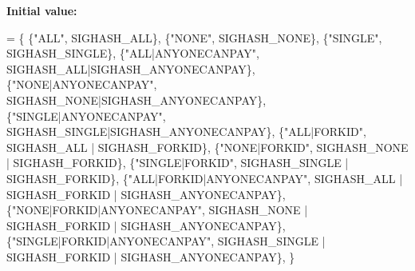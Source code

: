 {\bfseries Initial value\+:}
\begin{DoxyCode}
= \{
    \{\textcolor{stringliteral}{"ALL"}, SIGHASH\_ALL\},
    \{\textcolor{stringliteral}{"NONE"}, SIGHASH\_NONE\},
    \{\textcolor{stringliteral}{"SINGLE"}, SIGHASH\_SINGLE\},
    \{\textcolor{stringliteral}{"ALL|ANYONECANPAY"}, SIGHASH\_ALL|SIGHASH\_ANYONECANPAY\},
    \{\textcolor{stringliteral}{"NONE|ANYONECANPAY"}, SIGHASH\_NONE|SIGHASH\_ANYONECANPAY\},
    \{\textcolor{stringliteral}{"SINGLE|ANYONECANPAY"}, SIGHASH\_SINGLE|SIGHASH\_ANYONECANPAY\},
    \{\textcolor{stringliteral}{"ALL|FORKID"}, SIGHASH\_ALL | SIGHASH\_FORKID\},
    \{\textcolor{stringliteral}{"NONE|FORKID"}, SIGHASH\_NONE | SIGHASH\_FORKID\},
    \{\textcolor{stringliteral}{"SINGLE|FORKID"}, SIGHASH\_SINGLE | SIGHASH\_FORKID\},
    \{\textcolor{stringliteral}{"ALL|FORKID|ANYONECANPAY"},
     SIGHASH\_ALL | SIGHASH\_FORKID | SIGHASH\_ANYONECANPAY\},
    \{\textcolor{stringliteral}{"NONE|FORKID|ANYONECANPAY"},
     SIGHASH\_NONE | SIGHASH\_FORKID | SIGHASH\_ANYONECANPAY\},
    \{\textcolor{stringliteral}{"SINGLE|FORKID|ANYONECANPAY"},
     SIGHASH\_SINGLE | SIGHASH\_FORKID | SIGHASH\_ANYONECANPAY\},
\}
\end{DoxyCode}
